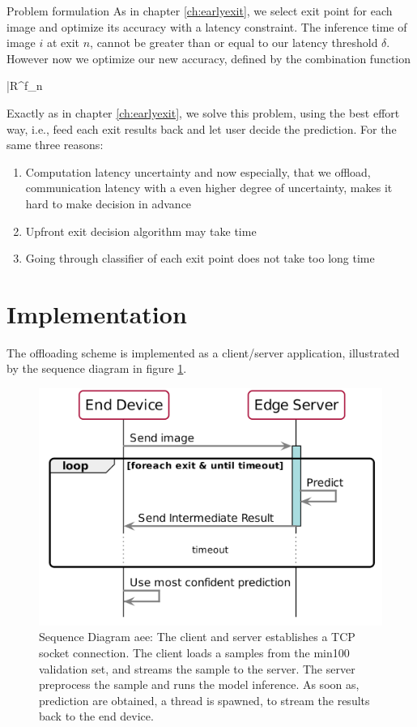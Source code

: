 \begin{enumdescript}
		\item[Problem formulation]   As in chapter \ref{ch:earlyexit}, we select exit point for each image and optimize its accuracy with a latency constraint. The inference time of image $ i $ at exit $ n $, cannot be greater than or equal to our latency threshold $ \delta $. However now we optimize our new accuracy, defined by the combination function
		
		
		\begin{maxi}
			{}{\bar{R}^f_n}
			{}{}
		\end{maxi}
		
		Exactly as in chapter \ref{ch:earlyexit}, we solve this problem,  using the best effort way, i.e., feed each exit results back and let user decide the prediction. For the same three reasons:
		\begin{enumerate}
			\item Computation latency uncertainty and now especially, that we offload, communication latency with a even higher degree of uncertainty, makes it hard to make decision in advance
			\item Upfront exit decision algorithm may take time
			\item Going through classifier of each exit point does not take too long time
		\end{enumerate}
		
			
	\end{enumdescript}  

\section{Implementation} \label{sec:edge-implementation}

The offloading scheme is implemented as a client/server application, illustrated by the sequence diagram in figure \ref{fig:sequence-diagram}. 

\begin{figure}
	\captionsetup[subfigure]{justification=centering}
	\centering
	\includegraphics[width=.7\linewidth]{figures/models/sequence_diagram}
	\caption[Sequence Diagram \acrshort{aee}]{Sequence Diagram \acrshort{aee}: The client and server establishes a TCP socket connection. The client loads a samples from the \gls{min100} validation set, and streams the sample to the server. The server preprocess the sample and runs the model inference. As soon as, prediction are obtained, a thread is spawned, to stream the results back to the end device. }
	\label{fig:sequence-diagram}
\end{figure}

